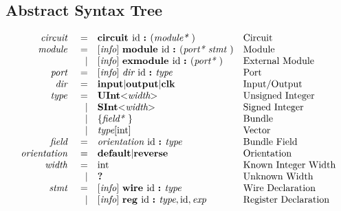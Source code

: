 \documentclass[10pt]{article}
\begin{document}
\subsection{Abstract Syntax Tree}
\[
\begin{array}{rrll}
\text{\em circuit\ }    &=     &\text{\bf circuit\ } \text{id } \text{\bf :\ } (\text{\em module*\ })                                        &\text{Circuit}\\
\text{\em module\ }     &=     &[\text{\em info}]\  \text{\bf module\ }  \text{id } \text{\bf :\ } (\text{\em port*\ } \text{\em stmt\ })                          &\text{Module}\\
                &\vert &[\text{\em info}]\  \text{\bf exmodule\ }  \text{id } \text{\bf :\ } (\text{\em port*\ })                                  &\text{External Module}\\
\text{\em port\ }       &=     &[\text{\em info}]\  \text{\em dir\ } \text{id } \text{\bf :\ } \text{\em type\ }                                           &\text{Port}\\
\text{\em dir\ }        &=     &\text{\bf input} \vert \text{\bf output} \vert \text{\bf clk}                                &\text{Input/Output}\\
\text{\em type\ }       &=     &\text{\bf UInt} \text{\bf $<$} \text{\em width} \text{\bf $>$}                                    &\text{Unsigned Integer}\\
                &\vert &\text{\bf SInt} \text{\bf $<$} \text{\em width} \text{\bf $>$}                                    &\text{Signed Integer}\\
                &\vert &\{\text{\em field*\ }\}                                                         &\text{Bundle}\\
                &\vert &\text{\em type}[\text{int}]                                                             &\text{Vector}\\
\text{\em field\ }      &=     &\text{\em orientation\ } \text{id } \text{\bf :\ } \text{\em type\ }                                         &\text{Bundle Field}\\
\text{\em orientation\ }&=     &\text{\bf default} \vert \text{\bf reverse}                                             &\text{Orientation}\\
\text{\em width\ }      &=     &\text{int}                                                                         &\text{Known Integer Width}\\
                &\vert &\text{\bf ?\ }                                                                        &\text{Unknown Width}\\
\text{\em stmt\ }       &=     &[\text{\em info}]\  \text{\bf wire\ } \text{id } \text{\bf :\ } \text{\em type\ }                                          &\text{Wire Declaration}\\
                &\vert &[\text{\em info}]\  \text{\bf reg\ } \text{id } \text{\bf :\ }  \text{\em type} , \text{id} , \text{\em exp}                      &\text{Register Declaration}\\

\end{array}\]
\end{document}
